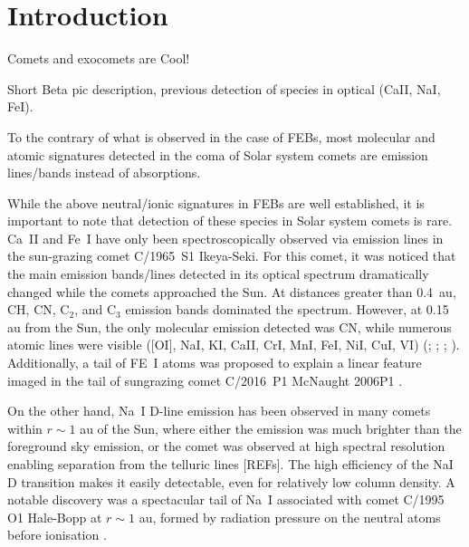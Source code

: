 \documentclass{aa}
\begin{document}
\section{Introduction}

Comets and exocomets are Cool!

Short Beta pic description, previous detection of species in optical (CaII, NaI, FeI).

To the contrary of what is observed in the case of FEBs, most molecular and atomic signatures detected in the coma of Solar system comets are emission lines/bands instead of absorptions.


While the above neutral/ionic signatures in FEBs are well established, it is important to note that detection of these species in Solar system comets is rare. Ca~II and Fe~I have only been spectroscopically observed via emission lines in the sun-grazing comet C/1965~S1 Ikeya-Seki. For this comet, it was noticed that the main emission bands/lines detected in its optical spectrum dramatically changed while the comets approached the Sun. At distances greater than 0.4~au, CH, CN, C$_2$, and C$_3$ emission bands dominated the spectrum. However, at 0.15 au from the Sun, the only molecular emission detected was CN, while numerous atomic lines were visible ([OI], NaI, KI, CaII, CrI, MnI, FeI, NiI, CuI, VI) (\citealp{Dufay65}; \citealp{Thackeray1966}; \citealp{Preston1967}; \citealp{Slaughter1969}).
Additionally, a tail of FE~I atoms was proposed to explain a linear feature imaged in the tail of sungrazing comet C/2016~P1 McNaught 2006P1 \citep{Fulle2007}. 

On the other hand, Na~I D-line emission has been observed in many comets within $r \sim 1$ au of the Sun, where either the emission was much brighter than the foreground sky emission, or the comet was observed at high spectral resolution enabling separation from the telluric lines [REFs]. The high efficiency of the NaI D transition makes it easily detectable, even for relatively low column density. A notable discovery was a spectacular tail of Na~I associated with comet C/1995 O1 Hale-Bopp at $r\sim 1$ au, formed by radiation pressure on the neutral atoms before ionisation \citep{Cremonese1997}. 
\end{document}
